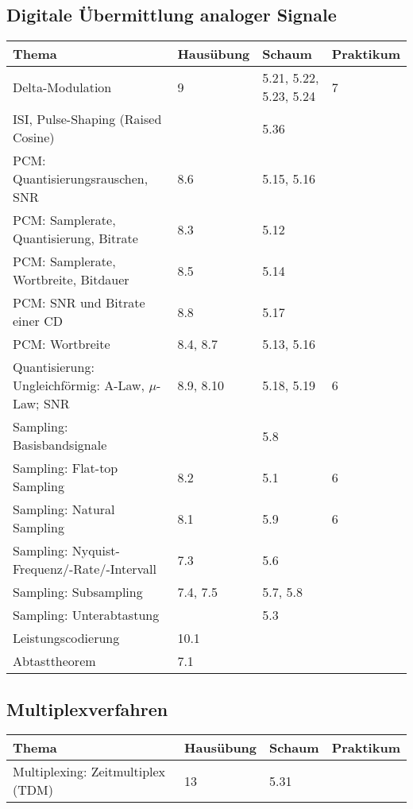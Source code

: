 \subsection{Digitale Übermittlung analoger Signale}
	\begin{tabular}{|p{9cm}|p{2.5cm}|p{3.5cm}|p{2cm}|}
	\hline
	\textbf{Thema} & \textbf{Hausübung} & \textbf{Schaum} & \textbf{Praktikum} \\ \hline
	Delta-Modulation & 9 & 5.21, 5.22, 5.23, 5.24 & 7 \\ \hline
	ISI, Pulse-Shaping (Raised Cosine) &  & 5.36 &  \\ \hline
	PCM: Quantisierungsrauschen, SNR & 8.6 & 5.15, 5.16 &  \\ \hline
	PCM: Samplerate, Quantisierung, Bitrate & 8.3 & 5.12 &  \\ \hline
	PCM: Samplerate, Wortbreite, Bitdauer & 8.5 & 5.14 &  \\ \hline
	PCM: SNR und Bitrate einer CD & 8.8 & 5.17 &  \\ \hline
	PCM: Wortbreite & 8.4, 8.7 & 5.13, 5.16 &  \\ \hline
	Quantisierung: Ungleichförmig: A-Law, $\mu$-Law; SNR & 8.9, 8.10 & 5.18, 5.19
	& 6 \\ \hline Sampling: Basisbandsignale & & 5.8 &  \\ \hline
	Sampling: Flat-top Sampling & 8.2 & 5.1 & 6 \\ \hline
	Sampling: Natural Sampling & 8.1 & 5.9 & 6 \\ \hline
	Sampling: Nyquist-Frequenz/-Rate/-Intervall & 7.3 & 5.6 &  \\ \hline
	Sampling: Subsampling & 7.4, 7.5 & 5.7, 5.8 &  \\ \hline
	Sampling: Unterabtastung & & 5.3 &  \\ \hline
	Leistungscodierung & 10.1 && \\ \hline
	Abtasttheorem & 7.1 & & \\ \hline
	\end{tabular}


\subsection{Multiplexverfahren}
	\begin{tabular}{|p{9cm}|p{2.5cm}|p{3.5cm}|p{2cm}|}
	\hline
	\textbf{Thema} & \textbf{Hausübung} & \textbf{Schaum} & \textbf{Praktikum} \\ \hline
	Multiplexing: Zeitmultiplex (TDM) & 13 & 5.31 &  \\ \hline
	\end{tabular}

